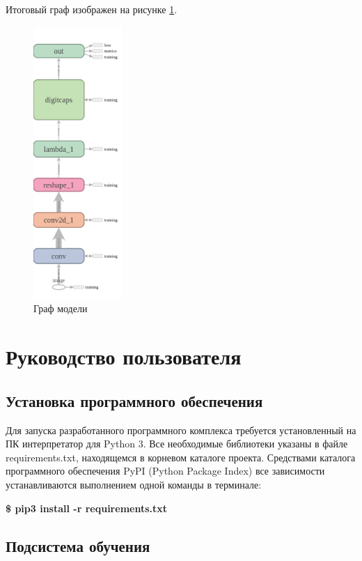 Итоговый граф изображен на рисунке \ref{impl:graph}.

\begin{figure}[!h]
	\centering
	\includegraphics[width=0.3\textwidth]{inc/img/graph}
	\caption{Граф модели}
	\label{impl:graph}
\end{figure}

\section{Руководство пользователя}

\subsection*{Установка программного обеспечения}

Для запуска разработанного программного комплекса требуется установленный на ПК интерпретатор для Python 3. Все необходимые библиотеки указаны в файле requirements.txt, находящемся в корневом каталоге проекта. Средствами каталога программного обеспечения PyPI (Python Package Index) все зависимости устанавливаются выполнением одной команды в терминале:

\textbf{\$ pip3 install -r requirements.txt}

\subsection*{Подсистема обучения}

